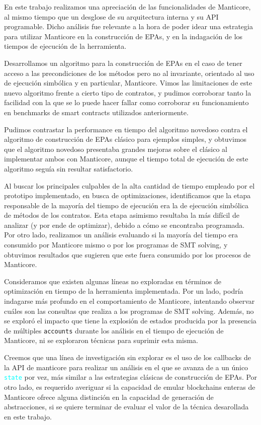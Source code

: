 En este trabajo realizamos una apreciación de las funcionalidades de Manticore, al mismo tiempo que un desglose de su arquitectura interna y su API programable.
Dicho análisis fue relevante a la hora de poder idear una estrategia para utilizar Manticore en la construcción de EPAs, y en la indagación de los tiempos de ejecución de la herramienta.

Desarrollamos un algoritmo para la construcción de EPAs en el caso de tener acceso a las precondiciones de los métodos pero no al invariante, orientado al uso de ejecución simbólica y en particular, Manticore.
Vimos las limitaciones de este nuevo algoritmo frente a cierto tipo de contratos, y pudimos corroborar tanto la facilidad con la que se lo puede hacer fallar como corroborar su funcionamiento en benchmarks de smart contracts utilizados anteriormente.

Pudimos contrastar la performance en tiempo del algoritmo novedoso contra el algoritmo de construcción de EPAs clásico para ejemplos simples, y obtuvimos que el algoritmo novedoso presentaba grandes mejoras sobre el clásico al implementar ambos con Manticore, aunque el tiempo total de ejecución de este algoritmo seguía sin resultar satisfactorio.

Al buscar los principales culpables de la alta cantidad de tiempo empleado por el prototipo implementado, en busca de optimizaciones, identificamos que la etapa responsable de la mayoría del tiempo de ejecución	era la de ejecución simbólica de métodos de los contratos.
Esta etapa asimismo resultaba la más difícil de analizar (y por ende de optimizar), debido a cómo se encontraba programada.
Por otro lado, realizamos un análisis evaluando si la mayoría del tiempo era consumido por Manticore mismo o por los programas de SMT solving, y obtuvimos resultados que sugieren que este fuera consumido por los procesos de Manticore.

Consideramos que existen algunas líneas no exploradas en términos de optimización en tiempo de la herramienta implementada.
Por un lado, podría indagarse más profundo en el comportamiento de Manticore, intentando observar cuáles son las consultas que realiza a los programas de SMT solving.
Además, no se exploró el impacto que tiene la explosión de estados producida por la presencia de múltiples \texttt{accounts} durante los análisis en el tiempo de ejecución de Manticore, ni se exploraron técnicas para suprimir esta misma.

Creemos que una línea de investigación sin explorar es el uso de los callbacks de la API de manticore para realizar un análisis en el que se avanza de a un único \textcolor{cyan}{\texttt{state}} por vez, más similar a las estrategias clásicas de construcción de EPAs.
Por otro lado, es requerido averiguar si la capacidad de emular blockchains enteras de Manticore ofrece alguna distinción en la capacidad de generación de abstracciones, si se quiere terminar de evaluar el valor de la técnica desarollada en este trabajo.
